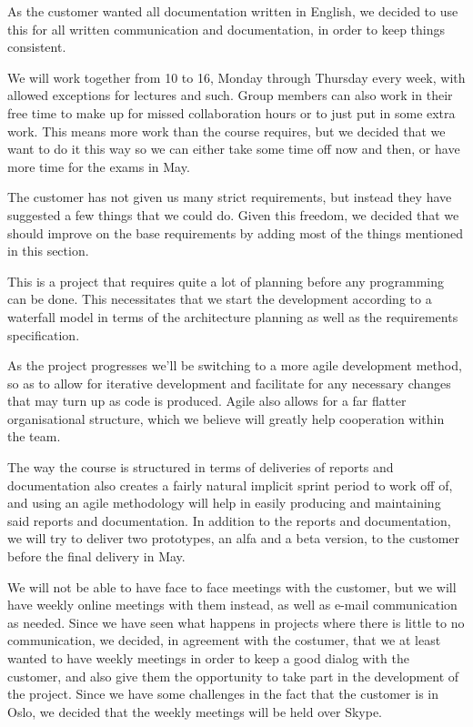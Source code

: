 \documentclass[12pt]{article}
\begin{document}
    As the customer wanted all documentation written in English, we decided to use this for all written communication and documentation, in order to keep things consistent.

    We will work together from 10 to 16, Monday through Thursday every week, with allowed exceptions for lectures and such. Group members can also work in their free time to make up for missed collaboration hours or to just put in some extra work. This means more work than the course requires, but we decided that we want to do it this way so we can either take some time off now and then, or have more time for the exams in May.

    The customer has not given us many strict requirements, but instead they have suggested a few things that we could do. Given this freedom, we decided that we should improve on the base requirements by adding most of the things mentioned in this section.

    This is a project that requires quite a lot of planning before any programming can be done. This necessitates that we start the development according to a waterfall model in terms of the architecture planning as well as the requirements specification.
    
    As the project progresses we’ll be switching to a more agile development method, so as to allow for iterative development and facilitate for any necessary changes that may turn up as code is produced. Agile also allows for a far flatter organisational structure, which we believe will greatly help cooperation within the team.
    
    The way the course is structured in terms of deliveries of reports and documentation also creates a fairly natural implicit sprint period to work off of, and using an agile methodology will help in easily producing and maintaining said reports and documentation. In addition to the  reports and documentation, we will try to deliver two prototypes, an alfa and a beta version, to the customer before the final delivery in May.

    We will not be able to have face to face meetings with the customer, but we will have weekly online meetings with them instead, as well as e-mail communication as needed. Since we have seen what happens in projects where there is little to no communication, we decided, in agreement with the costumer, that we at least wanted to have weekly meetings in order  to keep a good dialog with the customer, and also give them the opportunity to take part in the development of the project. Since we have some challenges in the fact that the customer is in Oslo, we decided that the weekly meetings will be held over Skype.
\end{document}
